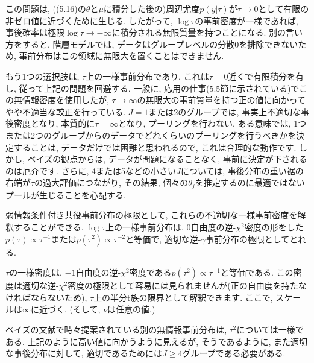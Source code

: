 \documentclass[10pt,dvipdfmx,a4]{beamer}
\begin{document}
\begin{frame}
この問題は, ((5.16)の$\theta$と$\mu$に積分した後の)周辺尤度$p(y|\tau)$が$\tau\rightarrow0$として有限の非ゼロ値に近づくために生じる.
したがって, $\log\tau$の事前密度が一様であれば, 事後確率は極限$\log\tau\rightarrow -\infty$に積分される無限質量を持つことになる.
別の言い方をすると, 階層モデルでは, データはグループレベルの分散0を排除できないため, 事前分布はこの領域に無限大を置くことはできません.

もう1つの選択肢は, $\tau$上の一様事前分布であり, これは$\tau=0$近くで有限積分を有し, 従って上記の問題を回避する.
一般に, 応用の仕事(5.5節に示されている)でこの無情報密度を使用したが, $\tau\rightarrow \infty$の無限大の事前質量を持つ正の値に向かってやや不適当な較正を行っている.
$J=1$または2のグループでは, 事実上不適切な事後密度となり, 本質的に$\tau=\infty$となり, プーリングを行わない.
ある意味では, 1つまたは2つのグループからのデータでどれくらいのプーリングを行うべきかを決定することは, データだけでは困難と思われるので, これは合理的な動作です.
しかし, ベイズの観点からは, データが問題になることなく, 事前に決定が下されるのは厄介です.
さらに, 4または5などの小さい$J$については, 事後分布の重い裾の右端が$\tau$の過大評価につながり, その結果, 個々の$\theta_j$を推定するのに最適ではないプールが生じることを心配する.
\end{frame}


\begin{frame}
弱情報条件付き共役事前分布の極限として, これらの不適切な一様事前密度を解釈することができる.
$\log\tau$上の一様事前分布は, 0自由度の逆-$\chi^2$密度の形をした$p(\tau)\propto\tau^{-1}$または$p(\tau^2)\propto\tau^{-2}$と等価で, 適切な逆-$\gamma$事前分布の極限としてとれる.

$\tau$の一様密度は, $-1$自由度の逆-$\chi^2$密度である$p(\tau^2)\propto\tau^{-1}$と等価である.
この密度は適切な逆-$\chi^2$密度の極限として容易には見られませんが(正の自由度を持たなければならないため), $\tau$上の半分t族の限界として解釈できます.
ここで, スケールは$\infty$に近づく.
(そして, $\nu$は任意の値.)

ベイズの文献で時々提案されている別の無情報事前分布は, $\tau^2$については一様である.
上記のように高い値に向かうように見えるが, そうであるように, また適切な事後分布に対して, 適切であるためには$J\geq 4$グループである必要がある.
\end{frame}

\end{document}
